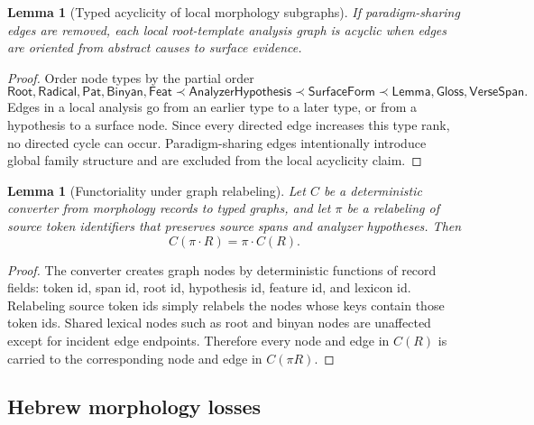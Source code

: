 \documentclass[11pt]{article}
\theoremstyle{definition}
\theoremstyle{plain}
\newtheorem{lemma}[definition]{Lemma}
\theoremstyle{remark}
\numberwithin{equation}{section}
\newcommand{\Root}{\mathsf{Root}}
\newcommand{\Pat}{\mathsf{Pat}}
\newcommand{\Binyan}{\mathsf{Binyan}}
\newcommand{\Feat}{\mathsf{Feat}}
\begin{document}
\begin{lemma}[Typed acyclicity of local morphology subgraphs]
If paradigm-sharing edges are removed, each local root-template analysis graph is acyclic when edges are oriented from abstract causes to surface evidence.
\end{lemma}

\begin{proof}
Order node types by the partial order
\begin{equation}
  \Root,\mathsf{Radical},\Pat,\Binyan,\Feat
  \prec \mathsf{AnalyzerHypothesis}\prec \mathsf{SurfaceForm}\prec \mathsf{Lemma},\mathsf{Gloss},\mathsf{VerseSpan}.
\end{equation}
Edges in a local analysis go from an earlier type to a later type, or from a hypothesis to a surface node.  Since every directed edge increases this type rank, no directed cycle can occur.  Paradigm-sharing edges intentionally introduce global family structure and are excluded from the local acyclicity claim.
\end{proof}

\begin{lemma}[Functoriality under graph relabeling]
Let $C$ be a deterministic converter from morphology records to typed graphs, and let $\pi$ be a relabeling of source token identifiers that preserves source spans and analyzer hypotheses.  Then
\begin{equation}
  C(\pi\cdot R)=\pi\cdot C(R).
\end{equation}
\end{lemma}

\begin{proof}
The converter creates graph nodes by deterministic functions of record fields: token id, span id, root id, hypothesis id, feature id, and lexicon id.  Relabeling source token ids simply relabels the nodes whose keys contain those token ids.  Shared lexical nodes such as root and binyan nodes are unaffected except for incident edge endpoints.  Therefore every node and edge in $C(R)$ is carried to the corresponding node and edge in $C(\pi R)$.
\end{proof}

\subsection{Hebrew morphology losses}
\end{document}
